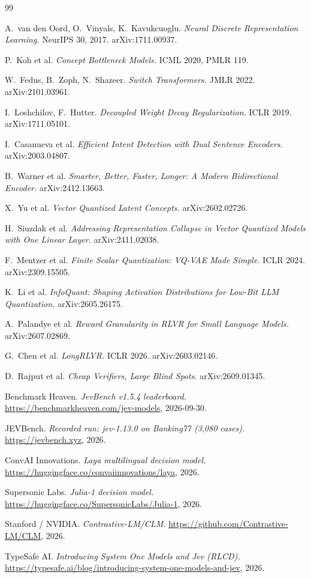 \documentclass[11pt]{article}
\begin{document}
\begin{thebibliography}{99}

 A.\ van den Oord, O.\ Vinyals, K.\ Kavukcuoglu.
\textit{Neural Discrete Representation Learning.} NeurIPS 30, 2017.
arXiv:1711.00937.

 P.\ Koh et al.
\textit{Concept Bottleneck Models.} ICML 2020, PMLR 119.

 W.\ Fedus, B.\ Zoph, N.\ Shazeer.
\textit{Switch Transformers.} JMLR 2022. arXiv:2101.03961.

 I.\ Loshchilov, F.\ Hutter.
\textit{Decoupled Weight Decay Regularization.} ICLR 2019.
arXiv:1711.05101.

 I.\ Casanueva et al.
\textit{Efficient Intent Detection with Dual Sentence Encoders.}
arXiv:2003.04807.

 B.\ Warner et al.
\textit{Smarter, Better, Faster, Longer: A Modern Bidirectional Encoder.}
arXiv:2412.13663.

 X.\ Yu et al.
\textit{Vector Quantized Latent Concepts.} arXiv:2602.02726.

 H.\ Siuzdak et al.
\textit{Addressing Representation Collapse in Vector Quantized Models with
One Linear Layer.} arXiv:2411.02038.

 F.\ Mentzer et al.
\textit{Finite Scalar Quantization: VQ-VAE Made Simple.} ICLR 2024.
arXiv:2309.15505.

 K.\ Li et al.
\textit{InfoQuant: Shaping Activation Distributions for Low-Bit LLM
Quantization.} arXiv:2605.26175.

 A.\ Palandye et al.
\textit{Reward Granularity in RLVR for Small Language Models.}
arXiv:2607.02869.

 G.\ Chen et al.
\textit{LongRLVR.} ICLR 2026. arXiv:2603.02146.

 D.\ Rajput et al.
\textit{Cheap Verifiers, Large Blind Spots.} arXiv:2609.01345.

 Benchmark Heaven. \textit{JevBench v1.5.4 leaderboard.}
\url{https://benchmarkheaven.com/jev-models}, 2026-09-30.

 JEVBench. \textit{Recorded run: jev-1.13.0 on
Banking77 (3,080 cases).} \url{https://jevbench.xyz}, 2026.

 ConvAI Innovations. \textit{Laya multilingual decision model.}
\url{https://huggingface.co/convaiinnovations/laya}, 2026.

 Supersonic Labs. \textit{Julia-1 decision model.}
\url{https://huggingface.co/SupersonicLabs/Julia-1}, 2026.

 Stanford / NVIDIA. \textit{Contrastive-LM/CLM.}
\url{https://github.com/Contrastive-LM/CLM}, 2026.

 TypeSafe AI. \textit{Introducing System One Models and
Jev (RLCD).} \url{https://typesafe.ai/blog/introducing-system-one-models-and-jev},
2026.

\end{thebibliography}
\end{document}
